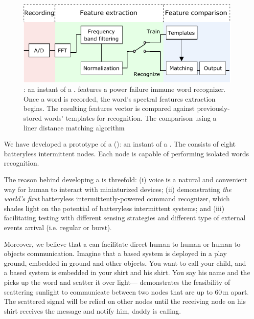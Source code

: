\begin{figure}
	\centering
	\includegraphics[width=\columnwidth]{figures/cis}
	\caption{\fullCIM: an instant of a \fullsys. \cim features a power failure immune word recognizer. Once a word is recorded, the word's spectral features extraction begins. The resulting features vector is compared against previously-stored words' templates for recognition. The comparison using a liner distance matching algorithm}
	\label{fig:cis}
\end{figure}

We have developed a prototype of a \fullcim (\cim): an instant of a \fullsys. The \cim consists of eight batteryless intermittent nodes. Each node is capable of performing isolated words recognition. 

The reason behind developing a \cim is threefold: (i) voice is a natural and convenient way for human to interact with miniaturized devices; (ii) demonstrating \textit{the world's first} batteryless intermittently-powered command recognizer, which shades light on the potential of batteryless intermittent systems; and (iii) facilitating testing with different sensing strategies and different type of external events arrival (i.e. regular  or burst). 

Moreover, we believe that a \cim can facilitate direct human-to-human or human-to-objects communication. Imagine that a \cim based system is deployed in a play ground, embedded in ground and other objects. You want to call your child, and a \cim based system is embedded in your shirt and his shirt. You say his name and the \cim picks up the word and scatter it over light---\cite{marco} demonstrates the feasibility of scattering sunlight to communicate between two nodes that are up to 60\,m apart. The scattered signal will be relied on other \cim nodes until the receiving node on his shirt receives the message and notify him, daddy is calling. 

